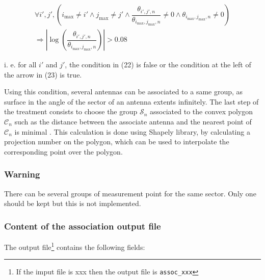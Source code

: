 \documentclass[a4paper, 11pt]{report}
\begin{document}
    \begin{align}
        \forall i', j', \left(i_\text{max} \neq i' \land j_\text{max} \neq j' \land \dfrac{\theta_{i', j', n}}{\theta_{i_\text{max}, j_\text{max}, n}} \neq 0 \land \theta_{i_\text{max}, j_\text{max}, n} \neq 0 \right) \\[10px]
        \Longrightarrow \left|\log\left(\dfrac{\theta_{i', j', n}}{\theta_{i_\text{max}, j_\text{max}, n}}\right)\right| > 0.08
    \end{align}
    
    i. e. for all $i'$ and $j'$, the condition in (22) is false or the condition at the left of the arrow in (23) is true. \newline
    
    Using this condition, several antennas can be associated to a same group, as surface in the angle of the sector of an antenna extents infinitely. The last step of the treatment consists to choose the group $\mathcal{S}_n$ associated to the convex polygon $\mathcal{C}_n$ such as the distance between the associate antenna and the nearest point of $\mathcal{C}_n$ is minimal \cite{trieu_visualization_2019}. This calculation is done using Shapely library, by calculating a projection number on the polygon, which can be used to interpolate the corresponding point over the polygon.
    
    \subsubsection{Warning}
    
    There can be several groups of measurement point for the same sector. Only one should be kept but this is not implemented. 
    
    \subsubsection{Content of the association output file}
    
    The output file\footnote{If the imput file is xxx then the output file is \texttt{assoc\_xxx}} contains the following fields:
    
\end{document}
